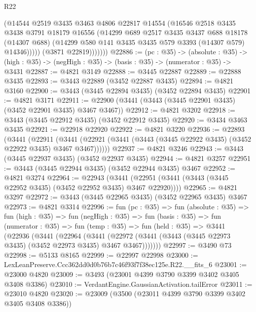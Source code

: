 \begin{lexlean}{R22}
\begin{coremodule}
                  (@14544
                    @2519
                    @3435
                    @3463
                    @4806
                    @22817
                    @14554
                    (@16546
                      @2518
                      @3435
                      @3438
                      @3791
                      @18179
                      @16556
                      (@14299
                        @689
                        @2517
                        @3435
                        @3437
                        @688
                        @18178
                        (@14307 @688)
                        (@14299 @580 @141 @3435 @3435 @579 @3393 (@14307 @579) @14346)))))
                (@3871 @22819)))))))
@22886 := (pc : @35) ->
  (absolute : @35) -> (high : @35) -> (negHigh : @35) -> (basis : @35) -> (numerator : @35) -> @3431
@22887 := @4821 @3149
@22888 := @3445 @22887
@22889 := @22888 @3435
@22893 := @3443 @22889 (@3452 @22887 @3435)
@22894 := @4821 @3160
@22900 := @3443 (@3445 @22894 @3435) (@3452 @22894 @3435)
@22901 := @4821 @3171
@22911 := @22900 (@3441 (@3443 (@3445 @22901 @3435) (@3452 @22901 @3435) @3467 @3467))
@22912 := @4821 @3202
@22918 := @3443 (@3445 @22912 @3435) (@3452 @22912 @3435)
@22920 := @3434 @3463 @3435
@22921 := @22918 @22920
@22922 := @4821 @3220
@22936 := @22893
    (@3441
      (@22911
        (@3441 (@22921 (@3441 (@3443 (@3445 @22922 @3435) (@3452 @22922 @3435) @3467 @3467))))))
@22937 := @4821 @3246
@22943 := @3443 (@3445 @22937 @3435) (@3452 @22937 @3435)
@22944 := @4821 @3257
@22951 := @3443 (@3445 @22944 @3435) (@3452 @22944 @3435) @3467
@22952 := @4821 @3274
@22964 := @22943
    (@3441 (@22951 (@3441 (@3443 (@3445 @22952 @3435) (@3452 @22952 @3435) @3467 @22920))))
@22965 := @4821 @3297
@22972 := @3443 (@3445 @22965 @3435) (@3452 @22965 @3435) @3467
@22973 := @4821 @3314
@22996 := fun (pc : @35) =>
  fun (absolute : @35) =>
  fun (high : @35) =>
  fun (negHigh : @35) =>
  fun (basis : @35) =>
  fun (numerator : @35) =>
  fun (temp : @35) =>
  fun (held : @35) =>
  @3441
    (@22936
      (@3441
        (@22964
          (@3441 (@22972 (@3441 (@3443 (@3445 @22973 @3435) (@3452 @22973 @3435) @3467 @3467)))))))
@22997 := @3490 @73
@22998 := @5133 @8165
@22999 := @22997 @22998
@23000 := LexLeanPreserve.Ccc362dd0d0b76b7c46f93f7f38ec125e.R22.__fits_6
@23001 := @23000 @4820
@23009 := @3493 (@23001 @4399 @3790 @3399 @3402 @3405 @3408 @3386)
@23010 := VerdantEngine.GaussianActivation.tailError
@23011 := @23010 @4820
@23020 := @23009 (@3500 (@23011 @4399 @3790 @3399 @3402 @3405 @3408 @3386))

\end{coremodule}
\end{lexlean}
